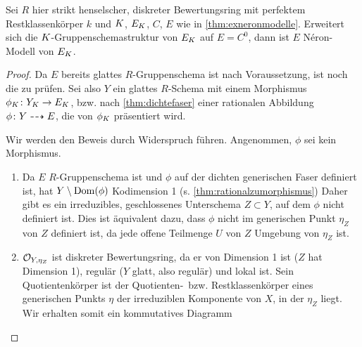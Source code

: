 \documentclass[german]{scrreprt}
\begin{document}
\begin{Lemma}\label{thm:fallstriktehenselisierung}
  Sei $R$ hier strikt henselscher, diskreter Bewertungsring mit
  perfektem Restklassenkörper $k$
  und $K$, $E_{K}$, $C$, $E$ wie in \autoref{thm:exneronmodelle}.
  Erweitert sich die $K$-Gruppenschemastruktur von $E_{K}$ auf
  $E=C^0$, dann ist $E$ Néron-Modell von $E_{K}$.
  \begin{proof}
    Da $E$ bereits glattes $R$-Gruppenschema ist nach Voraussetzung,
    ist noch die \NAbbEig zu prüfen.
    Sei also $Y$ ein glattes $R$-Schema mit einem Morphismus
    $\phi_{K}\colon Y_{K}\to E_{K}$, bzw. nach \autoref{thm:dichtefaser}
    einer rationalen Abbildung $\phi\colon Y\dashrightarrow E$, die von $\phi_{K}$
    präsentiert wird.

    Wir werden den Beweis durch Widerspruch führen.
    Angenommen, $\phi$ sei kein Morphismus.
    \begin{enumerate}
    \item Da $E$ $R$-Gruppenschema ist und $\phi$ auf der dichten
      generischen Faser definiert ist, hat $Y\setminus\operatorname{Dom}(\phi)$
      Kodimension 1 (s. \autoref{thm:rationalzumorphismus})
      Daher gibt es ein irreduzibles, geschlossenes Unterschema
      $Z\subset Y$, auf dem $\phi$ nicht definiert ist.
      Dies ist äquivalent dazu, dass $\phi$ nicht im generischen Punkt
      $\eta_Z$ von $Z$ definiert ist, da jede offene Teilmenge $U$ von
      $Z$ Umgebung von $\eta_Z$ ist.
    \item $\mathcal{O}_{Y,\eta_Z}$ ist diskreter Bewertungsring, da er von
      Dimension 1 ist ($Z$ hat Dimension 1), regulär ($Y$ glatt, also
      regulär) und lokal ist.
      Sein Quotientenkörper ist der Quotienten-~bzw. Restklassenkörper
      eines generischen Punkts $\eta$ der irreduziblen Komponente von
      $X$, in der $\eta_Z$ liegt. Wir erhalten somit ein kommutatives
      Diagramm
      \begin{center}
      \end{center}

\end{enumerate}
\end{proof}
\end{Lemma}
\end{document}
